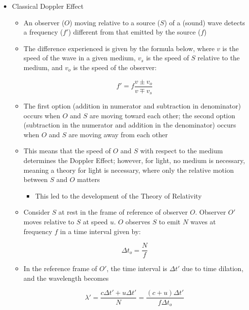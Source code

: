 \begin{itemize}
  \item Classical Doppler Effect

    \begin{itemize}

      \item An observer ($O$) moving relative to a source ($S$) of a (sound) wave detects a frequency ($f'$) different from that emitted by the source ($f$)

      \item The difference experienced is given by the formula below, where $v$ is the speed of the wave in a given medium, $v_s$ is the speed of $S$ relative to the medium, and $v_o$ is the speed of the observer:

        $$\boxed{f'=f\frac{v\pm v_o}{v \mp v_s}}$$

      \item The first option (addition in numerator and subtraction in denominator) occurs when $O$ and $S$ are moving toward each other; the second option (subtraction in the numerator and addition in the denominator) occurs when $O$ and $S$ are moving away from each other

      \item This means that the speed of $O$ and $S$ with respect to the medium determines the Doppler Effect; however, for light, no medium is necessary, meaning a theory for light is necessary, where only the relative motion between $S$ and $O$ matters

        \begin{itemize}

          \item This led to the development of the Theory of Relativity

        \end{itemize}

      \item Consider $S$ at rest in the frame of reference of observer $O$. Observer $O'$ moves relative to $S$ at speed $u$. $O$ observes $S$ to emit $N$ waves at frequency $f$ in a time interval given by:

        $$\boxed{\Delta t_o = \frac{N}{f}}$$

      \item In the reference frame of $O'$, the time interval is $\Delta t'$ due to time dilation, and the wavelength becomes


        $$\boxed{\lambda'=\frac{c\Delta t' + u\Delta t'}{N}=\frac{(c+u)\Delta t'}{f\Delta t_o}}$$


\end{itemize}
\end{itemize}

